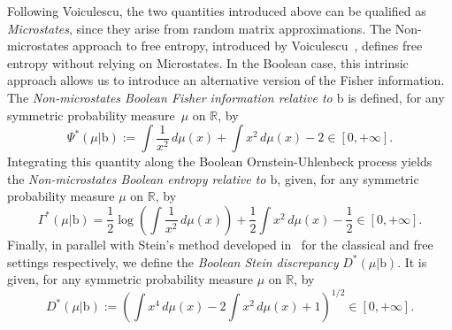 \documentclass[10pt, reqno]{amsart}
\numberwithin{equation}{section}
\theoremstyle{definition}
\theoremstyle{plain}
\theoremstyle{remark}
\newcommand{\1}{\mathbbm{1}}
\begin{document}
Following Voiculescu, the two quantities introduced above can be qualified as \textit{Microstates}, since they arise from random matrix approximations.   
The Non-microstates approach to free entropy, introduced by Voiculescu~\cite{voiculescu1998analogues}, defines free entropy without relying on Microstates. In the Boolean case, this intrinsic approach allows us to introduce an alternative version of the Fisher information. The \emph{Non-microstates Boolean Fisher information relative to $\mathbb{\mathrm{b}}$} is defined, for any symmetric probability measure~$\mu$ on $\mathbb{R}$, by
$$\Psi^*(\mu|\mathbb{\mathrm{b}}):=\int \frac{1}{x^2}\,d\mu(x)+ \int x^2\,d\mu(x)-2\in [0,+\infty].$$
Integrating this quantity along the Boolean Ornstein-Uhlenbeck process yields the \emph{Non-microstates Boolean entropy relative to $\mathbb{\mathrm{b}}$}, given, for any symmetric probability measure $\mu$ on $\mathbb{R}$, by
\begin{equation*}
    \Gamma^*(\mu|\mathbb{\mathrm{b}})=\frac{1}{2}\log\left(\int \frac{1}{x^2}\,d\mu(x)\right)+\frac{1}{2}\int x^2\,d\mu(x)-\frac{1}{2}\in [0,+\infty].
\end{equation*}
Finally, in parallel with Stein's method developed 
in~\cite{ledoux2015stein,fathi2017free} for the classical and free settings respectively, we define the \textit{Boolean Stein discrepancy} $D^*(\mu|\mathbb{\mathrm{b}})$. It is given, for any symmetric probability measure $\mu$ on $\mathbb{R}$, by
\begin{equation*}
    D^*(\mu|\mathbb{\mathrm{b}}):=\left(\int x^4\,d\mu(x)-2\int x^2\,d\mu(x)+1\right)^{1/2}\in [0,+\infty].
\end{equation*}
\end{document}
